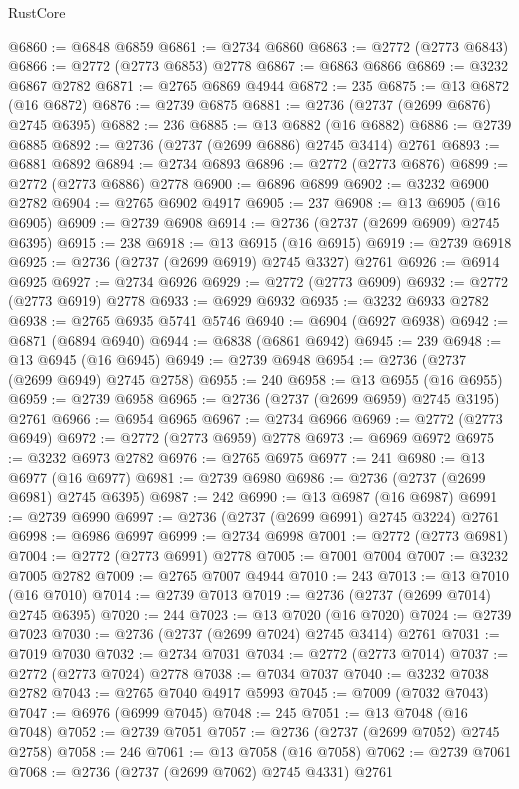 \begin{lexlean}{RustCore}
\begin{coremodule}
@6860 := @6848 @6859
@6861 := @2734 @6860
@6863 := @2772 (@2773 @6843)
@6866 := @2772 (@2773 @6853) @2778
@6867 := @6863 @6866
@6869 := @3232 @6867 @2782
@6871 := @2765 @6869 @4944
@6872 := 235
@6875 := @13 @6872 (@16 @6872)
@6876 := @2739 @6875
@6881 := @2736 (@2737 (@2699 @6876) @2745 @6395)
@6882 := 236
@6885 := @13 @6882 (@16 @6882)
@6886 := @2739 @6885
@6892 := @2736 (@2737 (@2699 @6886) @2745 @3414) @2761
@6893 := @6881 @6892
@6894 := @2734 @6893
@6896 := @2772 (@2773 @6876)
@6899 := @2772 (@2773 @6886) @2778
@6900 := @6896 @6899
@6902 := @3232 @6900 @2782
@6904 := @2765 @6902 @4917
@6905 := 237
@6908 := @13 @6905 (@16 @6905)
@6909 := @2739 @6908
@6914 := @2736 (@2737 (@2699 @6909) @2745 @6395)
@6915 := 238
@6918 := @13 @6915 (@16 @6915)
@6919 := @2739 @6918
@6925 := @2736 (@2737 (@2699 @6919) @2745 @3327) @2761
@6926 := @6914 @6925
@6927 := @2734 @6926
@6929 := @2772 (@2773 @6909)
@6932 := @2772 (@2773 @6919) @2778
@6933 := @6929 @6932
@6935 := @3232 @6933 @2782
@6938 := @2765 @6935 @5741 @5746
@6940 := @6904 (@6927 @6938)
@6942 := @6871 (@6894 @6940)
@6944 := @6838 (@6861 @6942)
@6945 := 239
@6948 := @13 @6945 (@16 @6945)
@6949 := @2739 @6948
@6954 := @2736 (@2737 (@2699 @6949) @2745 @2758)
@6955 := 240
@6958 := @13 @6955 (@16 @6955)
@6959 := @2739 @6958
@6965 := @2736 (@2737 (@2699 @6959) @2745 @3195) @2761
@6966 := @6954 @6965
@6967 := @2734 @6966
@6969 := @2772 (@2773 @6949)
@6972 := @2772 (@2773 @6959) @2778
@6973 := @6969 @6972
@6975 := @3232 @6973 @2782
@6976 := @2765 @6975
@6977 := 241
@6980 := @13 @6977 (@16 @6977)
@6981 := @2739 @6980
@6986 := @2736 (@2737 (@2699 @6981) @2745 @6395)
@6987 := 242
@6990 := @13 @6987 (@16 @6987)
@6991 := @2739 @6990
@6997 := @2736 (@2737 (@2699 @6991) @2745 @3224) @2761
@6998 := @6986 @6997
@6999 := @2734 @6998
@7001 := @2772 (@2773 @6981)
@7004 := @2772 (@2773 @6991) @2778
@7005 := @7001 @7004
@7007 := @3232 @7005 @2782
@7009 := @2765 @7007 @4944
@7010 := 243
@7013 := @13 @7010 (@16 @7010)
@7014 := @2739 @7013
@7019 := @2736 (@2737 (@2699 @7014) @2745 @6395)
@7020 := 244
@7023 := @13 @7020 (@16 @7020)
@7024 := @2739 @7023
@7030 := @2736 (@2737 (@2699 @7024) @2745 @3414) @2761
@7031 := @7019 @7030
@7032 := @2734 @7031
@7034 := @2772 (@2773 @7014)
@7037 := @2772 (@2773 @7024) @2778
@7038 := @7034 @7037
@7040 := @3232 @7038 @2782
@7043 := @2765 @7040 @4917 @5993
@7045 := @7009 (@7032 @7043)
@7047 := @6976 (@6999 @7045)
@7048 := 245
@7051 := @13 @7048 (@16 @7048)
@7052 := @2739 @7051
@7057 := @2736 (@2737 (@2699 @7052) @2745 @2758)
@7058 := 246
@7061 := @13 @7058 (@16 @7058)
@7062 := @2739 @7061
@7068 := @2736 (@2737 (@2699 @7062) @2745 @4331) @2761

\end{coremodule}
\end{lexlean}
